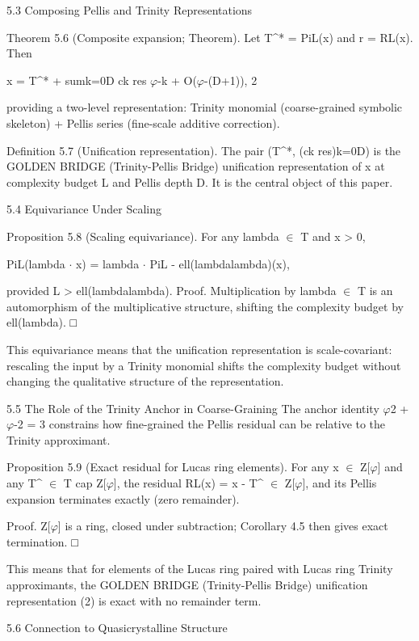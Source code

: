   5.3 Composing Pellis and Trinity Representations

        Theorem 5.6 (Composite expansion; Theorem). Let T^* = PiL(x) and r =
        RL(x). Then

  x = T^* + sumk=0D ck res $\varphi$-k + O($\varphi$-(D+1)), 2

  providing a two-level representation: Trinity monomial (coarse-grained symbolic
  skeleton) + Pellis series (fine-scale additive correction).

        Definition 5.7 (Unification representation). The pair (T^*, (ck res)k=0D) is
        the GOLDEN BRIDGE (Trinity-Pellis Bridge) unification representation of x at complexity budget L and Pellis
        depth D. It is the central object of this paper.

  5.4 Equivariance Under Scaling

        Proposition 5.8 (Scaling equivariance). For any lambda $\in$ T and x > 0,

  PiL(lambda $\cdot$ x) = lambda $\cdot$ PiL - ell(lambdalambda)(x),

  provided L > ell(lambdalambda). Proof. Multiplication by lambda $\in$ T is an
  automorphism of the multiplicative structure, shifting the complexity budget by
  ell(lambda). □

  This equivariance means that the unification representation is scale-covariant:
  rescaling the input by a Trinity monomial shifts the complexity budget without
  changing the qualitative structure of the representation.

  5.5 The Role of the Trinity Anchor in Coarse-Graining
  The anchor identity $\varphi$2 + $\varphi$-2 = 3 constrains how fine-grained the Pellis residual can be
  relative to the Trinity approximant.

        Proposition 5.9 (Exact residual for Lucas ring elements). For any x $\in$ Z[$\varphi$]
        and any T^ $\in$ T cap Z[$\varphi$], the residual RL(x) = x - T^ $\in$ Z[$\varphi$], and its Pellis
        expansion terminates exactly (zero remainder).

        Proof. Z[$\varphi$] is a ring, closed under subtraction; Corollary 4.5 then gives exact
        termination. □

  This means that for elements of the Lucas ring paired with Lucas ring Trinity
  approximants, the GOLDEN BRIDGE (Trinity-Pellis Bridge) unification representation (2) is exact with no
  remainder term.

  5.6 Connection to Quasicrystalline Structure

